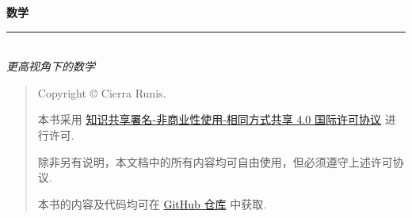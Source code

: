 \thispagestyle{empty}

\noindent\begin{minipage}{\textwidth}
  \raggedleft
  {\huge \bfseries 数学}
  \noindent\rule[-1ex]{\textwidth}{5pt}\\[2.5ex]
  \hfill\emph{\Large 更高视角下的数学}
\end{minipage}

\noindent{}


\newpage\thispagestyle{empty}
\begin{quote}\footnotesize
  Copyright \copyright{} {\the\year} Cierra Runis.

  本书采用 \href{https://creativecommons.org/licenses/by-nc-sa/4.0/deed.zh}{知识共享署名-非商业性使用-相同方式共享 4.0 国际许可协议} 进行许可.

  除非另有说明，本文档中的所有内容均可自由使用，但必须遵守上述许可协议.

  本书的内容及代码均可在 \href{https://github.com/Cierra-Runis/math}{GitHub 仓库} 中获取.
\end{quote}
